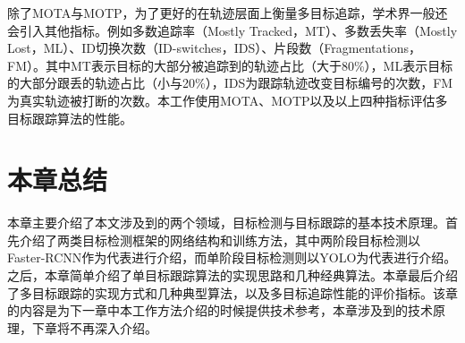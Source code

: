 除了MOTA与MOTP，为了更好的在轨迹层面上衡量多目标追踪，学术界一般还会引入其他指标。例如多数追踪率（Mostly Tracked，MT）、多数丢失率（Mostly Lost，ML）、ID切换次数（ID-switches，IDS）、片段数（Fragmentations，FM）。其中MT表示目标的大部分被追踪到的轨迹占比（大于80\%），ML表示目标的大部分跟丢的轨迹占比（小与20\%），IDS为跟踪轨迹改变目标编号的次数，FM为真实轨迹被打断的次数。本工作使用MOTA、MOTP以及以上四种指标评估多目标跟踪算法的性能。

\section{本章总结}
\label{tech_conclusion}
本章主要介绍了本文涉及到的两个领域，目标检测与目标跟踪的基本技术原理。首先介绍了两类目标检测框架的网络结构和训练方法，其中两阶段目标检测以Faster-RCNN作为代表进行介绍，而单阶段目标检测则以YOLO为代表进行介绍。之后，本章简单介绍了单目标跟踪算法的实现思路和几种经典算法。本章最后介绍了多目标跟踪的实现方式和几种典型算法，以及多目标追踪性能的评价指标。该章的内容是为下一章中本工作方法介绍的时候提供技术参考，本章涉及到的技术原理，下章将不再深入介绍。

\ifprint
	\newpage
	\thispagestyle{empty}
	\mbox{}
	
	\clearpage
	\setcounter{page}{10}
\fi